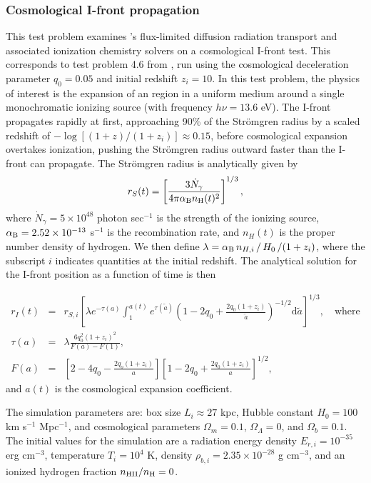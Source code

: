 \subsubsection{Cosmological I-front propagation}
\label{sec.tests.fld}

This test problem examines \enzo's flux-limited diffusion radiation
transport and associated ionization chemistry solvers on a
cosmological I-front test.  This corresponds to test problem 4.6 from
\cite{ReynoldsHayesPaschosNorman2009}, run using the cosmological
deceleration parameter $q_0 = 0.05$ and initial redshift $z_i=10$.
In this test problem, the physics of interest is the expansion of an  region
in a uniform medium around a single monochromatic ionizing source
(with frequency $h\nu = 13.6$ eV).  The I-front propagates rapidly at
first, approaching 90\% of the Str{\" o}mgren radius by a scaled
redshift of $-\log\left[(1+z)/(1+z_i)\right] \approx 0.15$, before
cosmological expansion overtakes ionization, pushing the Str{\"
  o}mgren radius outward faster than the I-front can propagate.  The Str{\" o}mgren radius is analytically given by
\[
   r_S(t) = \left[\frac{3\dot{N}_{\gamma}}{4\pi \alpha_{\rm B}
   n_{\rm H}(t)^2}\right]^{1/3}, 
\]
where $\dot{N}_{\gamma} = 5 \times 10^{48}$ photon sec$^{-1}$ is the
strength of the ionizing source, $\alpha_{\rm B} = 2.52 \times 10^{-13}$
s$^{-1}$ is the  recombination rate, and $n_H(t)$ is the
proper number density of hydrogen.  We then define $\lambda =
\alpha_{\rm B}\, n_{H,i}\, /\, H_0\, / (1+z_i)$, where the subscript $i$
indicates quantities at the initial redshift.  The analytical
solution for the I-front position as a function of time is then

\begin{eqnarray*}
   r_I(t) &=& r_{S,i} \left[\lambda e^{-\tau(a)} \int_1^{a(t)}
     e^{\tau(\tilde a)} \left(1 - 2q_0
     + \frac{2q_0(1+z_i)}{\tilde{a}}\right)^{-1/2}\mathrm
     d\tilde{a}\right]^{1/3}, \quad\text{where} \\ 
   \tau(a) &=& \lambda\frac{6q_0^2(1+z_i)^2}{F(a)-F(1)}, \\
   F(a) &=& \left[2-4q_0 - \frac{2q_o(1+z_i)}{a}\right] 
      \left[1-2q_0 + \frac{2q_0(1+z_i)}{a}\right]^{1/2},
\end{eqnarray*}
and $a(t)$ is the cosmological expansion coefficient.

The simulation parameters are: box size $L_i\approx 27$ kpc, Hubble
constant $H_0 = 100$ km s$^{-1}$ Mpc$^{-1}$, and cosmological parameters $\Omega_m = 0.1$, $\Omega_\Lambda=0$, and $\Omega_b = 0.1$.  The
initial values for the simulation are a radiation energy density
$E_{r,i} = 10^{-35}$ erg cm$^{-3}$, temperature $T_i = 10^4$ K,
density $\rho_{b,i} = 2.35 \times 10^{-28}$ g cm$^{-3}$, and an
ionized hydrogen fraction $n_{\rm HII}/n_{\rm H} = 0$.

